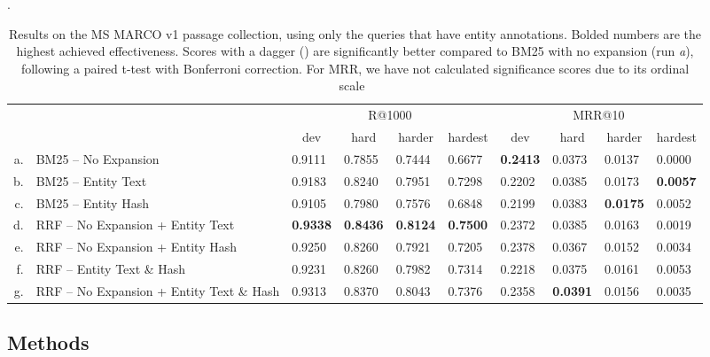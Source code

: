 \begin{table}[!t]
	\centering
	\caption{Results on the MS MARCO v1 passage collection, using only the queries that have entity annotations. Bolded numbers are the highest achieved effectiveness. Scores with a dagger (\dag) are significantly better compared to BM25 with no expansion (run \emph{a}), following a paired t-test with Bonferroni correction. For MRR, we have not calculated significance scores due to its ordinal scale~\citep{fuhr-mrr}}.
	\begin{tabular}{rl|llll|llll}
		\toprule
		\multirow{2}{*}{}
		& & \multicolumn{4}{c|}{R@1000} & \multicolumn{4}{c}{MRR@10} \\
		& & \multicolumn{1}{c}{dev} & \multicolumn{1}{c}{hard} & \multicolumn{1}{c}{harder} & \multicolumn{1}{c|}{hardest} & \multicolumn{1}{c}{dev} & \multicolumn{1}{c}{hard} & \multicolumn{1}{c}{harder} & \multicolumn{1}{c}{hardest} \\
		\midrule
		a. & BM25 -- No Expansion                           & 0.9111 & 0.7855 & 0.7444 & 0.6677 & \textbf{0.2413} & 0.0373 & 0.0137 & 0.0000 \\
		b. & BM25 -- Entity Text                            & 0.9183 & 0.8240\dag & 0.7951\dag & 0.7298\dag & 0.2202 & 0.0385 & 0.0173 & \textbf{0.0057} \\
		c. & BM25 -- Entity Hash                            & 0.9105 & 0.7980 & 0.7576 & 0.6848 & 0.2199 & 0.0383 & \textbf{0.0175} & 0.0052 \\ \midrule
		d. & RRF -- No Expansion + Entity Text                & \textbf{0.9338}\dag & \textbf{0.8436}\dag & \textbf{0.8124}\dag & \textbf{0.7500}\dag & 0.2372 & 0.0385 & 0.0163 & 0.0019 \\
		e. & RRF --  No Expansion + Entity Hash                & 0.9250\dag & 0.8260\dag & 0.7921\dag & 0.7205\dag & 0.2378 & 0.0367 & 0.0152 & 0.0034 \\
		f. & RRF -- Entity Text \& Hash                 & 0.9231 & 0.8260\dag & 0.7982\dag & 0.7314\dag & 0.2218 & 0.0375 & 0.0161 & 0.0053 \\
		g. & RRF -- No Expansion + Entity Text \& Hash  & 0.9313\dag & 0.8370\dag & 0.8043\dag & 0.7376\dag & 0.2358 & \textbf{0.0391} & 0.0156 & 0.0035 \\
		\bottomrule 
	\end{tabular}
	\label{tab:results-table}
\end{table}

\subsection{Methods}

